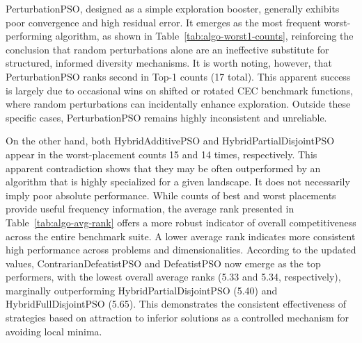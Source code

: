 { 
PerturbationPSO, designed as a simple exploration booster, generally exhibits poor convergence and high residual error. It emerges as the most frequent worst-performing algorithm, as shown in Table~\ref{tab:algo-worst1-counts}, reinforcing the conclusion that random perturbations alone are an ineffective substitute for structured, informed diversity mechanisms. It is worth noting, however, that PerturbationPSO ranks second in Top-1 counts (17 total). This apparent success is largely due to occasional wins on shifted or rotated CEC benchmark functions, where random perturbations can incidentally enhance exploration. Outside these specific cases, PerturbationPSO remains highly inconsistent and unreliable.


On the other hand, both HybridAdditivePSO and HybridPartialDisjointPSO appear in the worst-placement counts 15 and 14 times, respectively. This apparent contradiction shows that they may be often outperformed by an algorithm that is highly specialized for a given landscape. It does not necessarily imply poor absolute performance.
While counts of best and worst placements provide useful frequency information, the average rank presented in Table~\ref{tab:algo-avg-rank} offers a more robust indicator of overall competitiveness across the entire benchmark suite. A lower average rank indicates more consistent high performance across problems and dimensionalities. According to the updated values, ContrarianDefeatistPSO and DefeatistPSO now emerge as the top performers, with the lowest overall average ranks (5.33 and 5.34, respectively), marginally outperforming HybridPartialDisjointPSO (5.40) and HybridFullDisjointPSO (5.65). This demonstrates the consistent effectiveness of strategies based on attraction to inferior solutions as a controlled mechanism for avoiding local minima.
}
